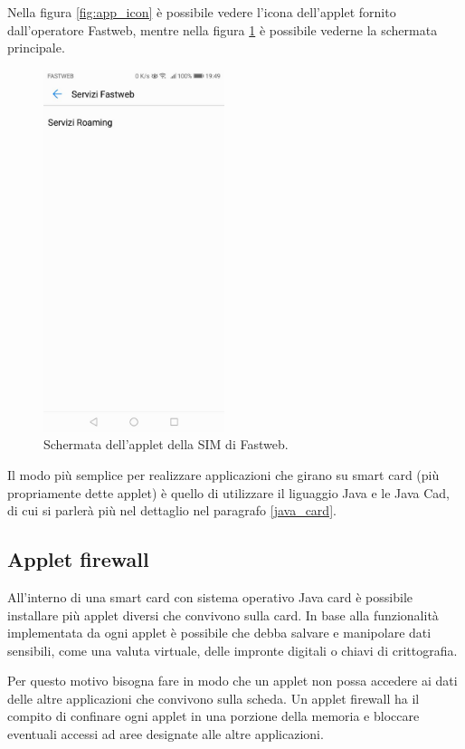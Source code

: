 Nella figura \ref{fig:app_icon} è possibile vedere l'icona dell'applet fornito dall'operatore Fastweb, mentre nella figura \ref{fig:app_screen} è possibile vederne la schermata principale.

\begin{figure}[h!]
  \centering
  \includegraphics[width=150pt]{pictures/screen_aplet_fastweb.jpg}
  \caption{Schermata dell'applet della SIM di Fastweb.}
  \label{fig:app_screen}
\end{figure}

Il modo più semplice per realizzare applicazioni che girano su smart card (più propriamente dette applet) è quello di utilizzare il liguaggio Java e le Java Cad, di cui si parlerà più nel dettaglio nel paragrafo \ref{java_card}.
\cite{secret_life}

\subsection{Applet firewall}
All'interno di una smart card con sistema operativo Java card è possibile installare più applet diversi che convivono sulla card. In base alla funzionalità implementata da ogni applet è possibile che debba salvare e manipolare dati sensibili, come una valuta virtuale, delle impronte digitali o chiavi di crittografia.

Per questo motivo bisogna fare in modo che un applet non possa accedere ai dati delle altre applicazioni che convivono sulla scheda. Un applet firewall ha il compito di confinare ogni applet in una porzione della memoria e bloccare eventuali accessi ad aree designate alle altre applicazioni.

